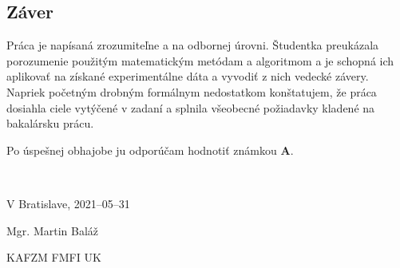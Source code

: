 \hypertarget{zuxe1ver}{%
\subsection{Záver}\label{zuxe1ver}}

Práca je napísaná zrozumiteľne a na odbornej úrovni. Študentka
preukázala porozumenie použitým matematickým metódam a algoritmom a je
schopná ich aplikovať na získané experimentálne dáta a vyvodiť z nich
vedecké závery. Napriek početným drobným formálnym nedostatkom
konštatujem, že práca dosiahla ciele vytýčené v zadaní a splnila
všeobecné požiadavky kladené na bakalársku prácu.

Po úspešnej obhajobe ju odporúčam hodnotiť známkou \textbf{A}.

~

V Bratislave, 2021--05--31

\hfill Mgr. Martin Baláž

\hfill KAFZM FMFI UK
